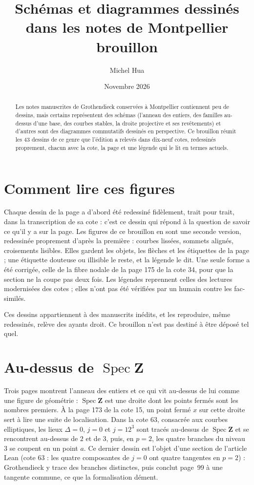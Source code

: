\documentclass[11pt,a4paper]{article}
\title{Schémas et diagrammes dessinés dans les notes de Montpellier\\[2pt]\large brouillon}
\author{Michel Hua}
\date{Novembre 2026}
\begin{document}
\maketitle
\begin{abstract}
Les notes manuscrites de Grothendieck conservées à Montpellier contiennent peu de dessins, mais certains représentent des schémas (l'anneau des entiers, des familles au-dessus d'une base, des courbes stables, la droite projective et ses revêtements) et d'autres sont des diagrammes commutatifs dessinés en perspective. Ce brouillon réunit les 43 dessins de ce genre que l'édition a relevés dans dix-neuf cotes, redessinés proprement, chacun avec la cote, la page et une légende qui le lit en termes actuels.
\end{abstract}

\section*{Comment lire ces figures}
Chaque dessin de la page a d'abord été redessiné fidèlement, trait pour trait, dans la transcription de sa cote : c'est ce dessin qui répond à la question de savoir ce qu'il y a sur la page. Les figures de ce brouillon en sont une seconde version, redessinée proprement d'après la première : courbes lissées, sommets alignés, croisements lisibles. Elles gardent les objets, les flèches et les étiquettes de la page ; une étiquette douteuse ou illisible le reste, et la légende le dit. Une seule forme a été corrigée, celle de la fibre nodale de la page 175 de la cote 34, pour que la section ne la coupe pas deux fois. Les légendes reprennent celles des lectures modernisées des cotes ; elles n'ont pas été vérifiées par un humain contre les fac-similés.

Ces dessins appartiennent à des manuscrits inédits, et les reproduire, même redessinés, relève des ayants droit. Ce brouillon n'est pas destiné à être déposé tel quel.


\section{Au-dessus de $\operatorname{Spec}\mathbf Z$}

Trois pages montrent l'anneau des entiers et ce qui vit au-dessus de lui comme une figure de géométrie : $\operatorname{Spec}\mathbf Z$ est une droite dont les points fermés sont les nombres premiers. À la page 173 de la cote 15, un point fermé $x$ sur cette droite sert à lire une suite de localisation. Dans la cote 63, consacrée aux courbes elliptiques, les lieux $\Delta = 0$, $j = 0$ et $j = 12^3$ sont tracés au-dessus de $\operatorname{Spec}\mathbf Z$ et se rencontrent au-dessus de $2$ et de $3$, puis, en $p = 2$, les quatre branches du niveau~$3$ se coupent en un point $a$. Ce dernier dessin est l'objet d'une section de l'article Lean (cote 63 : les quatre composantes de $j = 0$ ont quatre tangentes en $p = 2$) : Grothendieck y trace des branches distinctes, puis conclut page~99 à une tangente commune, ce que la formalisation dément.
\end{document}
